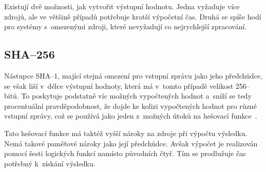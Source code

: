 Existují dvě možnosti, jak vytvořit výstupní hodnotu. Jedna vyžaduje více zdrojů, ale ve většině
případů potřebuje kratší výpočetní čas. Druhá se spíše hodí
pro systémy s~omezenými zdroji, které nevyžadují co nejrychlejší zpracování.


\subsection{SHA--256}
Nástupce SHA--1, mající stejná omezení pro vstupní zprávu jako jeho předchůdce, se však liší v~délce
výstupní hodnoty, která má v~tomto případě velikost 256--bitů. To poskytuje podstatně víc možných
vypočtených hodnot a~sníží se tedy procentuální pravděpodobnost, že dojde ke kolizi vypočtených
hodnot pro různé vstupní zprávy, což se používá jako jeden z~možných útoků na hešovací
funkce~\cite{NIST:2015}.

Tato hešovací funkce má taktéž vyšší nároky na zdroje při výpočtu výsledku. Nemá takové paměťové
nároky jako její předchůdce. Avšak výpočet je realizován pomocí šesti logických funkcí namísto
původních čtyř. Tím se prodlužuje čas potřebný k~získání výsledku.


